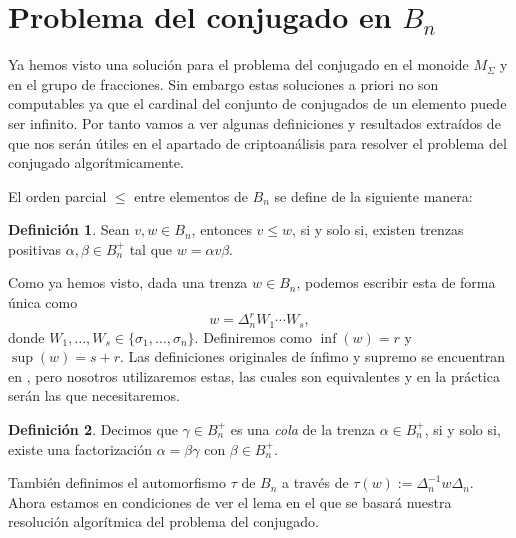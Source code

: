 \documentclass[12pt]{book}
\theoremstyle{definition}
\newtheorem{defi}{Definición}[section]
\begin{document}
\section{Problema del conjugado en $B_n$}

Ya hemos visto una solución para el problema del conjugado en el monoide $M_\Sigma$ y en el grupo de fracciones. Sin embargo estas soluciones a priori no son computables ya que el cardinal del conjunto de conjugados de un elemento puede ser infinito. Por tanto vamos a ver algunas definiciones y resultados extraídos de \cite{Att} que nos serán útiles en el apartado de criptoanálisis para resolver el problema del conjugado algorítmicamente.

El orden parcial $\leq$ entre elementos de $B_n$ se define de la siguiente manera:

\begin{defi}
Sean $v,w\in B_n$, entonces $v\leq w$, si y solo si, existen trenzas positivas $\alpha,\beta\in B_n^{+}$ tal que $w = \alpha v\beta$.
\end{defi}

Como ya hemos visto, dada una trenza $w\in B_n$, podemos escribir esta de forma única como
$$w = \Delta_n^r W_1\cdots W_s,$$
donde $W_1,\ldots,W_s\in\{\sigma_1,\ldots,\sigma_n\}$. Definiremos como $\inf(w) = r$ y $\sup(w)=s+r$. Las definiciones originales de ínfimo y supremo se encuentran en \cite{Alg}, pero nosotros utilizaremos estas, las cuales son equivalentes y en la práctica serán las que necesitaremos.

\begin{defi}
Decimos que $\gamma\in B_n^+$ es una \textit{cola} de la trenza $\alpha\in B_n^+$, si y solo si, existe una factorización $\alpha = \beta\gamma$ con $\beta\in B_n^+$.
\end{defi}

También definimos el automorfismo $\tau$ de $B_n$ a través de $\tau(w):=\Delta_n^{-1}w\Delta_n$. Ahora estamos en condiciones de ver el lema en el que se basará nuestra resolución algorítmica del problema del conjugado.
\end{document}
